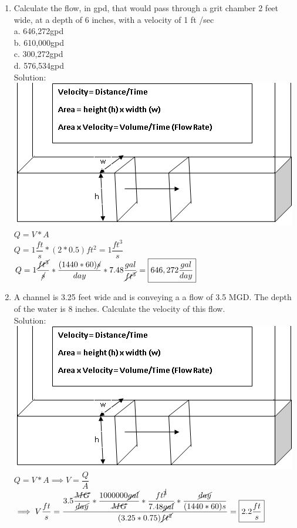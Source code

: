 \documentclass{article}
\begin{document}
\begin{enumerate}
\item Calculate the flow, in gpd, that would pass through a grit chamber 2 feet wide, at a depth of 6 inches, with a velocity of 1 ft /sec\\
a. 646,272gpd \\
b. 610,000gpd \\
c. 300,272gpd \\
d. 576,534gpd \\
Solution:\\
\includegraphics[scale=0.5]{ChannelFlow3}\\
$Q=V*A$\\
\vspace{0.3cm}
$Q=1\dfrac{ft}{s}*(2*0.5)ft^2=1\dfrac{ft^3}{s}$\\
\vspace{0.3cm}
$Q=1\dfrac{\cancel{ft^3}}{\cancel{s}}*\dfrac{(1440*60)\cancel{s}}{day}*7.48\dfrac{gal}{\cancel{ft^3}}=\boxed{646,272\dfrac{gal}{day}}$


\item A channel is 3.25 feet wide and is conveying a a flow of 3.5 MGD. The depth of the water is 8 inches. Calculate the velocity of this flow.\\
Solution:\\
\includegraphics[scale=0.5]{ChannelFlow3}\\
$Q=V*A \implies V=\dfrac{Q}{A}$\\
\vspace{0.3cm}
$\implies V\dfrac{ft}{s}=\dfrac{3.5\dfrac{\cancel{MG}}{\cancel{day}}*\dfrac{1000000\cancel{gal}}{\cancel{MG}}*\dfrac{ft^{\cancel{3}}}{7.48\cancel{gal}}*\dfrac{\cancel{day}}{(1440*60)s}}{(3.25*0.75)\cancel{ft^2}}=\boxed{2.2\dfrac{ft}{s}}$


\end{enumerate}
\end{document}
